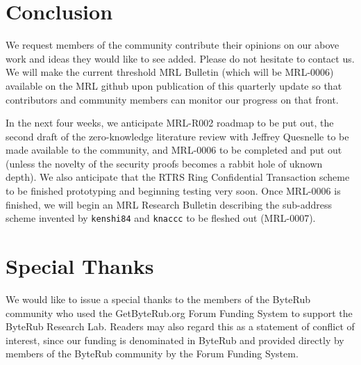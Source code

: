 \documentclass[12pt,english]{mrl}
\theoremstyle{definition}
\numberwithin{equation}{section}
\numberwithin{figure}{section}
\numberwithin{equation}{section}
\numberwithin{equation}{section}
\numberwithin{figure}{section}
\begin{document}
\section{Conclusion}

We request members of the community contribute their opinions on our above work and ideas they would like to see added. Please do not hesitate to contact us.  We will make the current threshold MRL Bulletin (which will be MRL-0006) available on the MRL github upon publication of this quarterly update so that contributors and community members can monitor our progress on that front. 

In the next four weeks, we anticipate MRL-R002 roadmap to be put out, the second draft of the zero-knowledge literature review with Jeffrey Quesnelle to be made available to the community, and MRL-0006 to be completed and put out (unless the novelty of the security proofs becomes a rabbit hole of uknown depth). We also anticipate that the RTRS Ring Confidential Transaction scheme to be finished prototyping and beginning testing very soon. Once MRL-0006 is finished, we will begin an MRL Research Bulletin describing the sub-address scheme invented by \texttt{kenshi84} and \texttt{knaccc} to be fleshed out (MRL-0007).




\section{Special Thanks} 

We would like to issue a special thanks to the members of the ByteRub community who used the GetByteRub.org Forum Funding System to support the ByteRub Research Lab. Readers may also regard this as a statement of conflict of interest, since our funding is denominated in ByteRub and provided directly by members of the ByteRub community by the Forum Funding System.

\medskip{}



\end{document}
